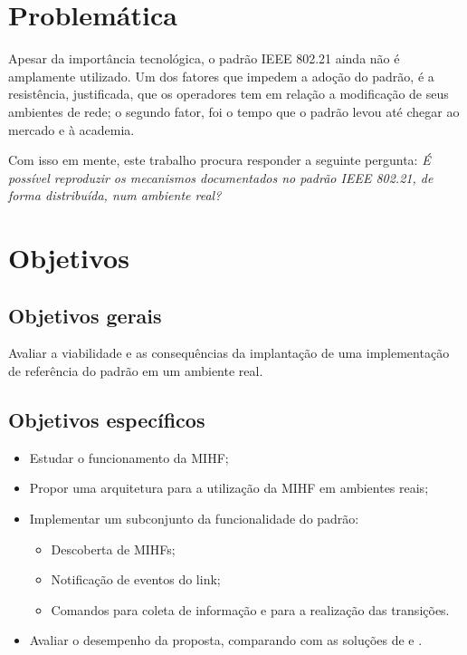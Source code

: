 \documentclass[12pt]{article}
\begin{document}
\section{Problemática} \label{sec:problematica} %

Apesar da importância tecnológica, o padrão IEEE 802.21 ainda não é amplamente 
utilizado. Um dos fatores que impedem a adoção do padrão, é a resistência, 
justificada, que os operadores tem em relação a modificação de seus ambientes 
de rede; o segundo fator, foi o tempo que o padrão levou até chegar ao mercado 
e à academia.

Com isso em mente, este trabalho procura responder a seguinte pergunta: 
\textit{É possível reproduzir os mecanismos documentados no padrão IEEE 
802.21, de forma distribuída, num ambiente real?}
\section{Objetivos} \label{sec:objetivos} %

\subsection{Objetivos gerais}
Avaliar a viabilidade e as consequências da implantação de uma implementação 
de referência do padrão em um ambiente real.

\subsection{Objetivos específicos}

\begin{itemize}

	\item Estudar o funcionamento da MIHF;
	\item Propor uma arquitetura para a utilização da MIHF em ambientes reais;
	\item Implementar um subconjunto da funcionalidade do padrão:

		\begin{itemize}
	
			\item Descoberta de MIHFs;
			\item Notificação de eventos do link;
			\item Comandos para coleta de informação e para a realização das 
				transições.

		\end{itemize}

	\item Avaliar o desempenho da proposta, comparando com as soluções de 
		\cite{tawil:2008} e \cite{machan:2008}.
	
\end{itemize}
\end{document}
